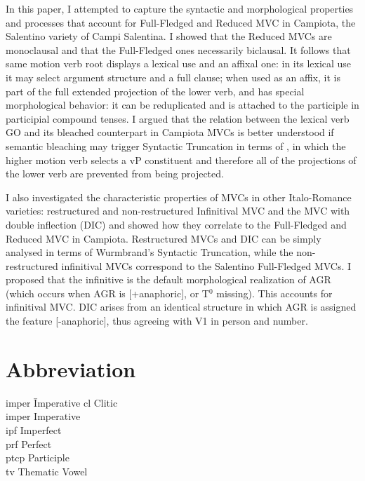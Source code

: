 \documentclass[output=paper]{langscibook}
\begin{document}
In this paper, I attempted to capture the syntactic and morphological properties and processes that account for Full-Fledged and Reduced MVC in Campiota, the Salentino variety of Campi Salentina. I showed that the Reduced MVCs are monoclausal and that the Full-Fledged ones necessarily biclausal. It follows that same motion verb root displays a lexical use and an affixal one:  in its lexical use it may select argument structure and a full clause; when used as an affix, it is part of the full extended projection of the lower verb, and has special morphological behavior: it can be reduplicated and is attached to the participle in participial compound tenses. I argued that the relation between the lexical verb GO and its bleached counterpart in Campiota MVCs is better understood if semantic bleaching may trigger Syntactic Truncation  in terms of \citet{wurmbrand2014a, wurmbrand2015, wurmbrand2017verb}, in which the higher motion verb selects a vP constituent and therefore all of the projections of the lower verb are prevented from being projected.

I also investigated the characteristic properties of MVCs in other Italo-Ro\-mance varieties: restructured and non-restructured Infinitival MVC and the MVC with double inflection (DIC) and showed how they correlate to the Full-Fledged and Reduced MVC in Campiota.  Restructured MVCs and DIC can be simply analysed in terms of Wurmbrand's Syntactic Truncation, while the non-restructured infinitival MVCs correspond to the Salentino Full-Fledged MVCs.  I proposed that the infinitive is the default morphological realization of AGR (which occurs when AGR is [+anaphoric], or T$^0$ missing).  This accounts for infinitival MVC.  DIC arises from an identical structure in which AGR is assigned the feature [-anaphoric], thus agreeing with V1 in person and number.

\section*{Abbreviation}
\begin{multicols}{2}
\begin{tabbing}
{\sc imper}\hspace{.5ex} \= Imperative \kill
{\sc cl} \> Clitic \\
{\sc imper} \> Imperative \\
{\sc ipf} \> Imperfect\\
{\sc prf} \> Perfect\\
{\sc ptcp} \> Participle\\
{\sc tv} \> Thematic Vowel
\end{tabbing}
\end{multicols}
\end{document}
